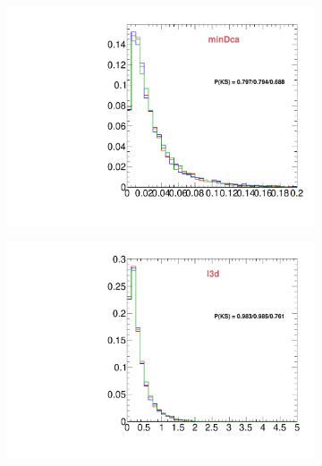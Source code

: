 \begin{figure}
\begin{subfigure}[b]{0.2\textwidth}
                \centering
                \includegraphics[width=\textwidth]{Figures/VariablesComparison/MC_endcaps_figs_3h/minDca}
                \label{fig:MC_endcaps_minDca_3h}
        \end{subfigure}
        \begin{subfigure}[b]{0.2\textwidth}
                \centering
                \includegraphics[width=\textwidth]{Figures/VariablesComparison/MC_endcaps_figs_3h/l3d}
                \label{fig:MC_endcaps_l3d_3h}
        \end{subfigure}
        \begin{subfigure}[b]{0.2\textwidth}
                \centering

\end{subfigure}
\end{figure}
